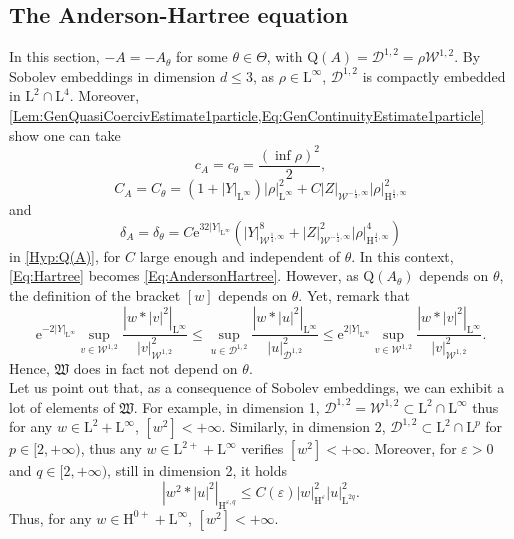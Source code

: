 \documentclass{article}
\def\W{\mathcal W}
\def\L{\mathrm L}
\def\H{\mathrm H}
\def\eps{\varepsilon}
\def\Q{\mathrm Q}
\theoremstyle{definition}
\numberwithin{equation}{section}
\newcommand{\e}{\mathrm{e}} %
\begin{document}
\subsection{The Anderson-Hartree equation}

In this section, $-A=-A_\theta$ for some $\theta\in\Theta$, with $\Q(A)=\mathcal{D}^{1,2}=\rho\W^{1,2}$. By Sobolev embeddings in dimension $d\leqslant 3$, as $\rho\in\L^\infty$, $\mathcal{D}^{1,2}$ is compactly embedded in $\L^2\cap\L^4$. Moreover, \cref{Lem:GenQuasiCoercivEstimate1particle,Eq:GenContinuityEstimate1particle} show one can take $$c_{A} = c_\theta=\frac{(\inf \rho)^2}{2},$$ $$C_A = C_\theta = \left(1+|Y|_{\L^\infty}\right)|\rho|_{\L^\infty}^2 + C|Z|_{\W^{-\frac{1}{4},\infty}}|\rho|_{\H^{\frac{1}{4},\infty}}^2$$ and  $$\delta_A=\delta_\theta =C\e^{32|Y|_{\L^\infty}}\left(|Y|_{\W^{\frac{1}{4},\infty}}^{8}+|Z|_{\W^{-\frac{1}{4},\infty}}^2|\rho|_{\H^{\frac{1}{4},\infty}}^4\right)$$ in \cref{Hyp:Q(A)}, for $C$ large enough and independent of $\theta$. In this context, \cref{Eq:Hartree} becomes \cref{Eq:AndersonHartree}. However, as $\Q(A_\theta)$ depends on $\theta$, the definition of the bracket $[w]$ depends on $\theta$. Yet, remark that
\begin{equation}\label{Eq:Equivalence[w2]theta}
    \e^{-2|Y|_{\L^\infty}}\sup_{v\in\W^{1,2}}\frac{\left|w*|v|^2\right|_{\L^\infty}}{|v|_{\W^{1,2}}^2}\leqslant\sup_{u\in\mathcal{D}^{1,2}}\frac{\left|w*|u|^2\right|_{\L^\infty}}{|u|_{\mathcal{D}^{1,2}}^2}\leqslant\e^{2|Y|_{\L^\infty}}\sup_{v\in\W^{1,2}}\frac{\left|w*|v|^2\right|_{\L^\infty}}{|v|_{\W^{1,2}}^2}.
\end{equation}
Hence, $\mathfrak{W}$ does in fact not depend on $\theta$.\\

Let us point out that, as a consequence of Sobolev embeddings, we can exhibit a lot of elements of $\mathfrak{W}$. For example, in dimension 1, $\mathcal{D}^{1,2}=\W^{1,2}\subset\L^2\cap\L^\infty$ thus for any  $w\in\L^2+\L^\infty$, $\left[w^2\right]<+\infty$. Similarly, in dimension 2, $\mathcal{D}^{1,2}\subset\L^2\cap\L^p$ for $p\in[2,+\infty)$, thus any  $w\in\L^{2+}+\L^\infty$ verifies $\left[w^2\right]<+\infty$. Moreover, for $\eps>0$ and $q\in[2,+\infty)$, still in dimension 2, it holds
$$\left|w^2*|u|^2\right|_{\H^{\eps,q}} \leqslant C(\eps)|w|_{\H^\eps}^2|u|_{\L^{2q}}^{2}.$$
Thus, for any $w\in\H^{0+}+\L^\infty$, $\left[w^2\right]<+\infty$.\\
\end{document}
